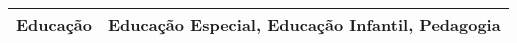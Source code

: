 \begin{longtable}[c]{ll}
    Educação                                                                        & Educação Especial, Educação Infantil, Pedagogia                                                                                                                                                                                                                                                                                                                                                                                                                                                                                                                                                                                                                                                                                                                                                                                                                                                                                                                                                                                                                                                                                                                                                                                                                                                                                                                                                                                                                                                                                                                                                                                                                                                                                                                                                         \\ \hline

\end{longtable}
